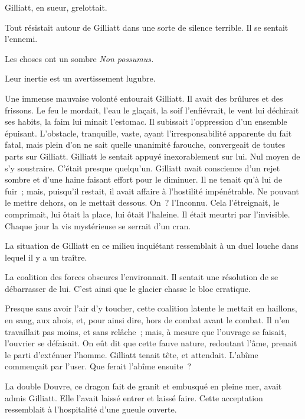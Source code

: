 \documentclass[french,twoside]{book} %
\begin{document}
Gilliatt, en sueur, grelottait.\par
Tout résistait autour de Gilliatt dans une sorte de silence terrible. Il se sentait l’ennemi.\par
Les choses ont un sombre \emph{Non possumus.}\par
Leur inertie est un avertissement lugubre.\par
Une immense mauvaise volonté entourait Gilliatt. Il avait des brûlures et des frissons. Le feu le mordait, l’eau le glaçait, la soif l’enfiévrait, le vent lui déchirait ses habits, la faim lui minait l’estomac. Il subissait l’oppression d’un ensemble épuisant. L’obstacle, tranquille, vaste, ayant l’irresponsabilité apparente du fait fatal, mais plein d’on ne sait quelle unanimité farouche, convergeait de toutes parts sur Gilliatt. Gilliatt le sentait appuyé inexorablement sur lui. Nul moyen de s’y soustraire. C’était presque quelqu’un. Gilliatt avait conscience d’un rejet sombre et d’une haine faisant effort pour le diminuer. Il ne tenait qu’à lui de fuir ; mais, puisqu’il restait, il avait affaire à l’hostilité  impénétrable. Ne pouvant le mettre dehors, on le mettait dessous. On ? l’Inconnu. Cela l’étreignait, le comprimait, lui ôtait la place, lui ôtait l’haleine. Il était meurtri par l’invisible. Chaque jour la vis mystérieuse se serrait d’un cran.\par
La situation de Gilliatt en ce milieu inquiétant ressemblait à un duel louche dans lequel il y a un traître.\par
La coalition des forces obscures l’environnait. Il sentait une résolution de se débarrasser de lui. C’est ainsi que le glacier chasse le bloc erratique.\par
Presque sans avoir l’air d’y toucher, cette coalition latente le mettait en haillons, en sang, aux abois, et, pour ainsi dire, hors de combat avant le combat. Il n’en travaillait pas moins, et sans relâche ; mais, à mesure que l’ouvrage se faisait, l’ouvrier se défaisait. On eût dit que cette fauve nature, redoutant l’âme, prenait le parti d’exténuer l’homme. Gilliatt tenait tête, et attendait. L’abîme commençait par l’user. Que ferait l’abîme ensuite ?\par
La double Douvre, ce dragon fait de granit et embusqué en pleine mer, avait admis Gilliatt. Elle l’avait laissé entrer et laissé faire. Cette acceptation ressemblait à l’hospitalité d’une gueule ouverte.\par
\end{document}
